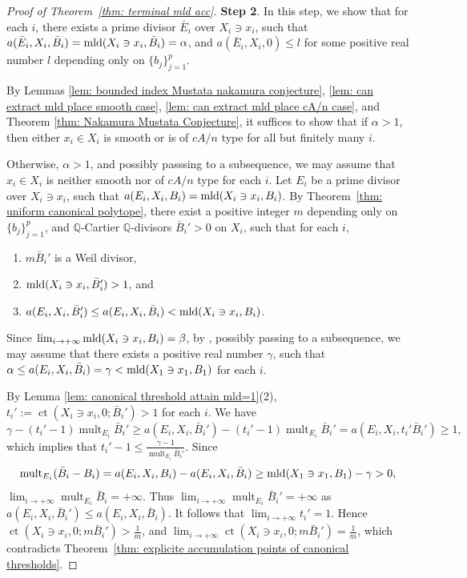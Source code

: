 \documentclass[11pt]{amsart}
\numberwithin{equation}{section}
\newcommand\han[1]{\todo[color=yellow!40]{#1}} %
\newcommand{\Qq}{\mathbb{Q}}
\newcommand{\mld}{{\rm{mld}}}
\newcommand{\ct}{\operatorname{ct}}
\newcommand{\mult}{\operatorname{mult}}
\theoremstyle{definition}
\theoremstyle{definition}
\begin{document}
\begin{proof}[Proof of Theorem~\ref{thm:  terminal mld acc}]
\medskip



\noindent\textbf{Step 2}. In this step, we show that for each $i$, there exists a prime divisor $\bar{E}_i$ over $X_i\ni x_i$, such that 
$a(\bar{E}_i,X_i,\bar{B}_i)=\mld(X_i\ni x_i,\bar{B}_i)=\alpha$, and $a(\bar{E}_i,X_i,0)\le l$ for some positive real number $l$ depending only on $\{{b}_j\}_{j=1}^p$.

By Lemmas \ref{lem: bounded index Mustata nakamura conjecture}, \ref{lem: can extract mld place smooth case}, \ref{lem: can extract mld place cA/n case}, and Theorem \ref{thm: Nakamura Mustata Conjecture}, it suffices to show that if $\alpha>1$, then either $x_i\in X_i$ is smooth or is of $cA/n$ type for all but finitely many $i$.

Otherwise, $\alpha>1$, and possibly passsing to a subsequence, we may assume that $x_i\in X_i$ is neither smooth nor of $cA/n$ type for each $i$. Let $E_i$ be a prime divisor over $X_i\ni x_i$, such that $a(E_i,X_i,B_i)=\mld(X_i\ni x_i,B_i)$. By Theorem~\ref{thm: uniform canonical polytope}, there exist a positive integer $m$ depending only on $\{{b}_j\}_{j=1}^p$, and $\Qq$-Cartier $\Qq$-divisors $\bar B_i'>0$ on $X_i$, such that for each $i$,
\begin{enumerate}
    \item $m\bar B_{i}'$ is a Weil divisor,
    \item $\mld(X_i\ni x_i, \bar B_{i}')> 1$, and
    \item $a(E_i,X_i,\bar B_{i}')\le a(E_i,X_i,\bar{B}_i)<\mld(X_i\ni x_i,B_i)$.
\end{enumerate}
Since $\lim_{i\to +\infty }\mld(X_i\ni x_i,B_i)=\beta$, by \cite[Theorem~1.2]{Nak16}, possibly passing to a subsequence, we may assume that there exists a positive real number $\gamma$, such that $\alpha\le a(E_i,X_i,\bar{B}_i)=\gamma<\mld(X_1\ni x_1,B_1)$ for each $i$.

By Lemma \ref{lem: canonical threshold attain mld=1}(2), $t_i':=\ct(X_i\ni x_i,0;\bar B_{i}')>1$ for each $i$. We have
$$\gamma-(t_i'-1)\mult_{E_i}\bar B_i'\ge a(E_i,X_i,\bar B_i')-(t_i'-1)\mult_{E_i}\bar B_i'=a(E_i,X_i,t_i'\bar B_i')\ge 1,$$
which implies that 
$t_i'-1\le \frac{\gamma-1}{\mult_{E_i}\bar B_i'}$. Since 
$$\mult_{E_i}(\bar B_i-B_i)=a(E_i,X_i,B_i)-a(E_i,X_i,\bar B_i)
\ge\mld(X_1\ni x_1,B_1)-\gamma>0,$$
$\lim_{i\to +\infty}\mult_{E_i}\bar B_i=+\infty$. Thus $\lim_{i\to +\infty}\mult_{E_i}\bar B_i'=+\infty$ as $a(E_i,X_i,\bar B_i')\le a(E_i,X_i,\bar B_i)$. It follows that $\lim_{i\to +\infty} t_i'=1$. Hence $\ct(X_i\ni x_i,0;m\bar B_i')>\frac{1}{m}$, and $\lim_{i\to +\infty}\ct(X_i\ni x_i,0;m\bar B_i')=\frac{1}{m}$, which contradicts Theorem~\ref{thm: explicite accumulation points of canonical thresholds}. 


\end{proof}
\end{document}
